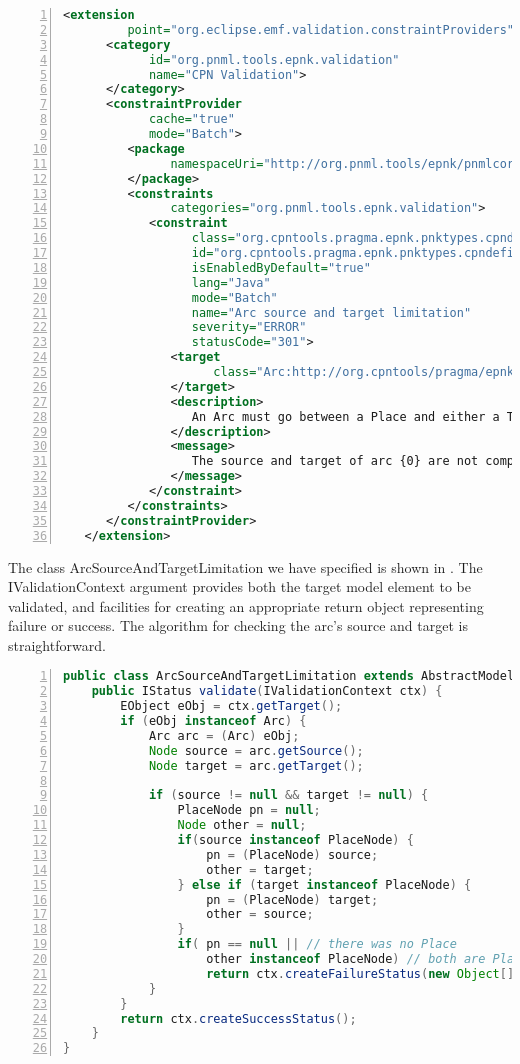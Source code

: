 \begin{lstlisting}[language=XML,label=lst:constraintextension,float,numbers=left,stepnumber=1,
caption=constraintProvider Extension] 
   <extension
         point="org.eclipse.emf.validation.constraintProviders">
      <category
            id="org.pnml.tools.epnk.validation"
            name="CPN Validation">
      </category>
      <constraintProvider
            cache="true"
            mode="Batch">
         <package
               namespaceUri="http://org.pnml.tools/epnk/pnmlcoremodel">
         </package>
         <constraints
               categories="org.pnml.tools.epnk.validation">
            <constraint
                  class="org.cpntools.pragma.epnk.pnktypes.cpndefinition.validation.ArcSourceAndTargetLimitation"
                  id="org.cpntools.pragma.epnk.pnktypes.cpndefinition.validation.ArcSourceAndTargetLimitation"
                  isEnabledByDefault="true"
                  lang="Java"
                  mode="Batch"
                  name="Arc source and target limitation"
                  severity="ERROR"
                  statusCode="301">
               <target
                     class="Arc:http://org.cpntools/pragma/epnk/pnktypes/cpndefinition">
               </target>
               <description>
                  An Arc must go between a Place and either a Transition or a Page.
               </description>
               <message>
                  The source and target of arc {0} are not compatible.
               </message>
            </constraint>
         </constraints>
      </constraintProvider>
   </extension>
\end{lstlisting}

The class ArcSourceAndTargetLimitation we have specified is shown in
.
The IValidationContext argument provides both the target model element to be
validated, and facilities for creating an appropriate return object representing
failure or success. The algorithm for checking the arc's source and target is
straightforward.

\begin{lstlisting}[language=Java,label=lst:constraintimpl,float,numbers=left,stepnumber=1,
caption=Constraint Implementation]
public class ArcSourceAndTargetLimitation extends AbstractModelConstraint {
	public IStatus validate(IValidationContext ctx) {
		EObject eObj = ctx.getTarget();
		if (eObj instanceof Arc) {
			Arc arc = (Arc) eObj;
			Node source = arc.getSource();
			Node target = arc.getTarget();
			
			if (source != null && target != null) {
				PlaceNode pn = null;
				Node other = null;
				if(source instanceof PlaceNode) {
					pn = (PlaceNode) source;
					other = target;
				} else if (target instanceof PlaceNode) {
					pn = (PlaceNode) target;
					other = source;
				}
				if(	pn == null || // there was no Place
					other instanceof PlaceNode) // both are Places
					return ctx.createFailureStatus(new Object[] {arc});
			} 
		} 
		return ctx.createSuccessStatus();
	}
}
\end{lstlisting}

